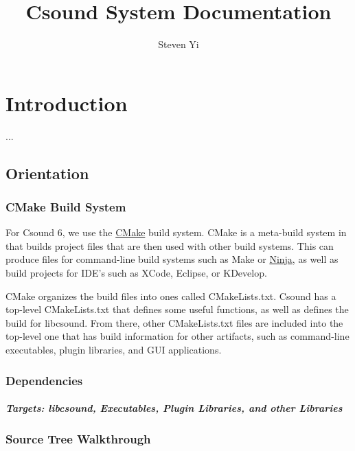 \documentclass[]{book}
\title{Csound System Documentation}
\author{Steven Yi}
\begin{document}
\maketitle

\chapter{Introduction}

...

\section{Orientation}

\subsection{CMake Build System}

For Csound 6, we use the \href{http://www.cmake.org}{CMake} build
system. CMake is a meta-build system in that builds project files that
are then used with other build systems. This can produce files for
command-line build systems such as Make or
\href{http://martine.github.io/ninja/}{Ninja}, as well as build projects
for IDE's such as XCode, Eclipse, or KDevelop.

CMake organizes the build files into ones called CMakeLists.txt. Csound
has a top-level CMakeLists.txt that defines some useful functions, as
well as defines the build for libcsound. From there, other
CMakeLists.txt files are included into the top-level one that has build
information for other artifacts, such as command-line executables,
plugin libraries, and GUI applications.

\subsection{Dependencies}

\paragraph{Targets: libcsound, Executables, Plugin Libraries, and other
Libraries}

\subsection{Source Tree Walkthrough}
\end{document}
